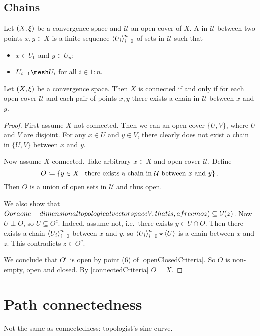 \subsection{Chains}
\begin{definition}
Let $\left( X,\xi \right)$ be a convergence space and $\mathcal{U}$ an open cover of $X$. A  in $\mathcal{U}$ between two points $x,y\in X$ is a finite sequence $\left\langle U_i \right\rangle_{i=0}^n$ of sets in $\mathcal{U}$ such that
\begin{itemize}
\item $x\in U_0$ and $y\in U_n$;
\item $U_{i-1}\mesh U_i$ for all $i\in 1:n$.
\end{itemize}
\end{definition}

\begin{proposition}
Let $\left( X,\xi \right)$ be a convergence space. Then $X$ is connected \textup{if and only if} for each open cover $\mathcal{U}$ and each pair of points $x,y$ there exists a chain in $\mathcal{U}$ between $x$ and $y$.
\end{proposition}
\begin{proof}
First assume $X$ not connected. Then we can an open cover $\{U,V\}$, where $U$ and $V$ are disjoint. For any $x\in U$ and $y\in V$, there clearly does not exist a chain in $\{U,V\}$ between $x$ and $y$.

Now assume $X$ connected. Take arbitrary $x\in X$ and open cover $\mathcal{U}$. Define
\[ O \coloneqq \left\{ y\in X \;\middle|\; \text{there exists a chain in $\mathcal{U}$ between $x$ and $y$} \right\}. \]
Then $O$ is a union of open sets in $\mathcal{U}$ and thus open.

We also show that $Oor a one-dimensional topological vectorspace V , that is, a free moz)\subseteq \operatorname{\mathcal{V}}(z)$. Now $U\perp O$, so $U\subseteq O^c$. Indeed, assume not, i.e.\ there exists $y\in U\cap O$. Then there exists a chain $\left\langle U_{i} \right\rangle_{i=0}^n$ between $x$ and $y$, so $\left\langle U_{i} \right\rangle_{i=0}^n\star\left\langle U \right\rangle$ is a chain between $x$ and $z$. This contradicts $z\in O^c$.

We conclude that $O^c$ is open by point (6) of \ref{openClosedCriteria}. So $O$ is non-empty, open and closed. By \ref{connectedCriteria} $O = X$.
\end{proof}


\section{Path connectedness}
\begin{example}
Not the same as connectedness: topologist's sine curve. 
\end{example}


